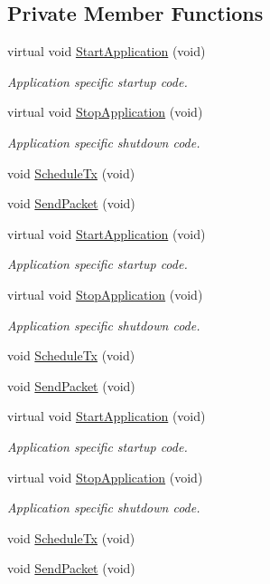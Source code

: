 \subsection*{Private Member Functions}
\begin{DoxyCompactItemize}
\item 
virtual void \hyperlink{classMyApp_a716120e3449296007a1b493db4a16560}{Start\+Application} (void)
\begin{DoxyCompactList}\small\item\em Application specific startup code. \end{DoxyCompactList}\item 
virtual void \hyperlink{classMyApp_a69051ff18125cf53b8f83df56caa16f7}{Stop\+Application} (void)
\begin{DoxyCompactList}\small\item\em Application specific shutdown code. \end{DoxyCompactList}\item 
void \hyperlink{classMyApp_a58aa062a269ba2e29250db014d369a18}{Schedule\+Tx} (void)
\item 
void \hyperlink{classMyApp_aec30dc53058a6239182294be2b60734e}{Send\+Packet} (void)
\item 
virtual void \hyperlink{classMyApp_acde566142fd7320280158e12d04135ef}{Start\+Application} (void)
\begin{DoxyCompactList}\small\item\em Application specific startup code. \end{DoxyCompactList}\item 
virtual void \hyperlink{classMyApp_a5fe8371947ecfada9e289077d2ca6645}{Stop\+Application} (void)
\begin{DoxyCompactList}\small\item\em Application specific shutdown code. \end{DoxyCompactList}\item 
void \hyperlink{classMyApp_a58aa062a269ba2e29250db014d369a18}{Schedule\+Tx} (void)
\item 
void \hyperlink{classMyApp_aec30dc53058a6239182294be2b60734e}{Send\+Packet} (void)
\item 
virtual void \hyperlink{classMyApp_acde566142fd7320280158e12d04135ef}{Start\+Application} (void)
\begin{DoxyCompactList}\small\item\em Application specific startup code. \end{DoxyCompactList}\item 
virtual void \hyperlink{classMyApp_a5fe8371947ecfada9e289077d2ca6645}{Stop\+Application} (void)
\begin{DoxyCompactList}\small\item\em Application specific shutdown code. \end{DoxyCompactList}\item 
void \hyperlink{classMyApp_a58aa062a269ba2e29250db014d369a18}{Schedule\+Tx} (void)
\item 
void \hyperlink{classMyApp_aec30dc53058a6239182294be2b60734e}{Send\+Packet} (void)
\end{DoxyCompactItemize}
